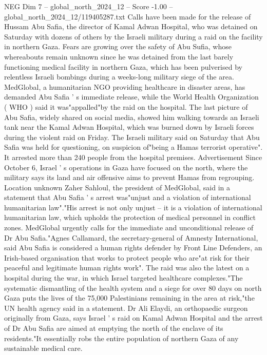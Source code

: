 \begin{textsample}{NEG Dim 7 – global\_north\_2024\_12 – Score -1.00 – global\_north\_2024\_12/119405287.txt}  \label{ex:f7_neg_166}
Calls have been made for the release of Hussam Abu Safia, the director of Kamal Adwan Hospital, who was detained on Saturday with dozens of others by the Israeli military during a raid on the facility in northern Gaza.
Fears are growing over the safety of Abu Sufia, whose whereabouts remain unknown since he was detained from the last barely functioning medical facility in northern Gaza, which has been pulverised by relentless Israeli bombings during a weeks-long military siege of the area.
MedGlobal, a humanitarian NGO providing healthcare in disaster areas, has demanded Abu Safia ' s immediate release, while the World Health Organization ( WHO ) said it was"appalled"by the raid on the hospital.
The last picture of Abu Safia, widely shared on social media, showed him walking towards an Israeli tank near the Kamal Adwan Hospital, which was burned down by Israeli forces during the violent raid on Friday.
The Israeli military said on Saturday that Abu Safia was held for questioning, on suspicion of"being a Hamas terrorist operative".
It arrested more than 240 people from the hospital premises.
Advertisement Since October 6, Israel ' s operations in Gaza have focused on the north, where the military says its land and air offensive aims to prevent Hamas from regrouping.
Location unknown Zaher Sahloul, the president of MedGlobal, said in a statement that Abu Safia ' s arrest was"unjust and a violation of international humanitarian law"."His arrest is not only unjust -- it is a violation of international humanitarian law, which upholds the protection of medical personnel in conflict zones.
MedGlobal urgently calls for the immediate and unconditional release of Dr Abu Safia."Agnes Callamard, the secretary-general of Amnesty International, said Abu Safia is considered a human rights defender by Front Line Defenders, an Irish-based organisation that works to protect people who are"at risk for their peaceful and legitimate human rights work".
The raid was also the latest on a hospital during the war, in which Israel targeted healthcare complexes."The systematic dismantling of the health system and a siege for over 80 days on north Gaza puts the lives of the 75,000 Palestinians remaining in the area at risk,"the UN health agency said in a statement.
Dr Ali Elaydi, an orthopaedic surgeon originally from Gaza, says Israel ' s raid on Kamal Adwan Hospital and the arrest of Dr Abu Safia are aimed at emptying the north of the enclave of its residents."It essentially robs the entire population of northern Gaza of any sustainable medical care.

\end{textsample}
